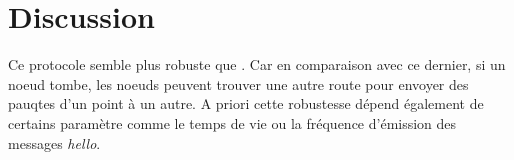     \section{Discussion}
        Ce protocole semble plus robuste que \espmesh. Car en comparaison avec ce dernier, si un noeud tombe,
        les noeuds peuvent trouver une autre route pour envoyer des pauqtes d'un point à un autre.
        A priori cette robustesse dépend également de certains paramètre comme le temps de vie ou la fréquence
        d'émission des messages \textit{hello}.
        
